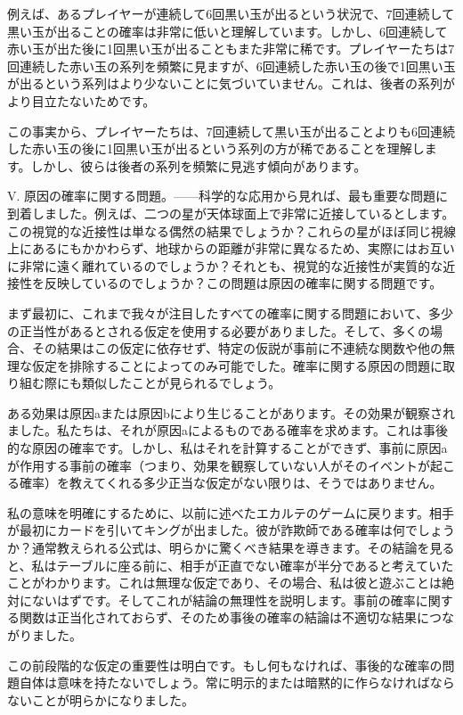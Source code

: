 \documentclass[a4paper,11pt,openany]{ltjsbook}
\begin{document}
例えば、あるプレイヤーが連続して6回黒い玉が出るという状況で、7回連続して黒い玉が出ることの確率は非常に低いと理解しています。しかし、6回連続して赤い玉が出た後に1回黒い玉が出ることもまた非常に稀です。プレイヤーたちは7回連続した赤い玉の系列を頻繁に見ますが、6回連続した赤い玉の後で1回黒い玉が出るという系列はより少ないことに気づいていません。これは、後者の系列がより目立たないためです。


この事実から、プレイヤーたちは、7回連続して黒い玉が出ることよりも6回連続した赤い玉の後に1回黒い玉が出るという系列の方が稀であることを理解します。しかし、彼らは後者の系列を頻繁に見逃す傾向があります。

V. 原因の確率に関する問題。——科学的な応用から見れば、最も重要な問題に到着しました。例えば、二つの星が天体球面上で非常に近接しているとします。この視覚的な近接性は単なる偶然の結果でしょうか？これらの星がほぼ同じ視線上にあるにもかかわらず、地球からの距離が非常に異なるため、実際にはお互いに非常に遠く離れているのでしょうか？それとも、視覚的な近接性が実質的な近接性を反映しているのでしょうか？この問題は原因の確率に関する問題です。

まず最初に、これまで我々が注目したすべての確率に関する問題において、多少の正当性があるとされる仮定を使用する必要がありました。そして、多くの場合、その結果はこの仮定に依存せず、特定の仮説が事前に不連続な関数や他の無理な仮定を排除することによってのみ可能でした。確率に関する原因の問題に取り組む際にも類似したことが見られるでしょう。

ある効果は原因aまたは原因bにより生じることがあります。その効果が観察されました。私たちは、それが原因aによるものである確率を求めます。これは事後的な原因の確率です。しかし、私はそれを計算することができず、事前に原因aが作用する事前の確率（つまり、効果を観察していない人がそのイベントが起こる確率）を教えてくれる多少正当な仮定がない限りは、そうではありません。

私の意味を明確にするために、以前に述べたエカルテのゲームに戻ります。相手が最初にカードを引いてキングが出ました。彼が詐欺師である確率は何でしょうか？通常教えられる公式は、明らかに驚くべき結果を導きます。その結論を見ると、私はテーブルに座る前に、相手が正直でない確率が半分であると考えていたことがわかります。これは無理な仮定であり、その場合、私は彼と遊ぶことは絶対にないはずです。そしてこれが結論の無理性を説明します。事前の確率に関する関数は正当化されておらず、そのため事後の確率の結論は不適切な結果につながりました。

この前段階的な仮定の重要性は明白です。もし何もなければ、事後的な確率の問題自体は意味を持たないでしょう。常に明示的または暗黙的に作らなければならないことが明らかになりました。
\end{document}
